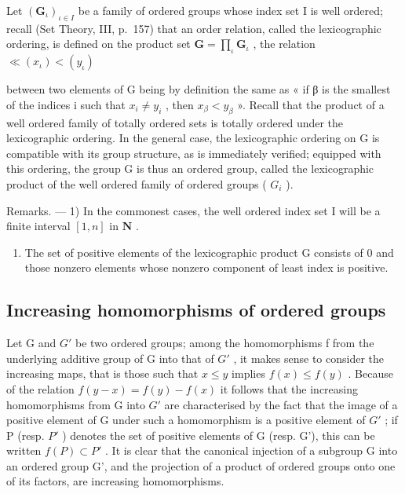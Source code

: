 Let \((\mathbf{G}_{\iota})_{\iota \in I}\) be a family of ordered groups whose index set I is well ordered; recall (Set Theory, III, p.~157) that an order relation, called the lexicographic ordering, is defined on the product set \(\mathbf{G} = \prod_{\iota} \mathbf{G}_{\iota}\) , the relation \(\ll (x_{\iota}) < (y_{\iota})\)

between two elements of G being by definition the same as « if β is the smallest of the indices i such that \(x_{i} \neq y_{i}\) , then \(x_{\beta} < y_{\beta}\) ». Recall that the product of a well ordered family of totally ordered sets is totally ordered under the lexicographic ordering. In the general case, the lexicographic ordering on G is compatible with its group structure, as is immediately verified; equipped with this ordering, the group G is thus an ordered group, called the lexicographic product of the well ordered family of ordered groups ( \(G_{i}\) ).

Remarks. --- 1) In the commonest cases, the well ordered index set I will be a finite interval \([1, n]\) in \(\mathbf{N}\) .

\begin{enumerate}
\def\labelenumi{\arabic{enumi})}
\setcounter{enumi}{1}
\tightlist
\item
  The set of positive elements of the lexicographic product G consists of 0 and those nonzero elements whose nonzero component of least index is positive.
\end{enumerate}

\subsection{Increasing homomorphisms of ordered groups}

Let G and \(G'\) be two ordered groups; among the homomorphisms f from the underlying additive group of G into that of \(G'\) , it makes sense to consider the increasing maps, that is those such that \(x \leqslant y\) implies \(f(x) \leqslant f(y)\) . Because of the relation \(f(y - x) = f(y) - f(x)\) it follows that the increasing homomorphisms from G into \(G'\) are characterised by the fact that the image of a positive element of G under such a homomorphism is a positive element of \(G'\) ; if P (resp. \(P'\) ) denotes the set of positive elements of G (resp. G'), this can be written \(f(P) \subset P'\) . It is clear that the canonical injection of a subgroup G into an ordered group G', and the projection of a product of ordered groups onto one of its factors, are increasing homomorphisms.

